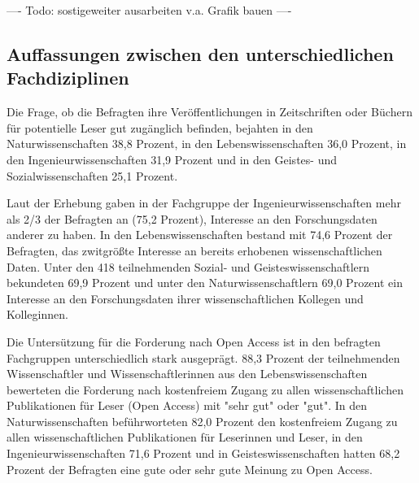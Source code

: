 ---- Todo: sostigeweiter ausarbeiten v.a. Grafik bauen ----

\subsection{Auffassungen zwischen den unterschiedlichen Fachdiziplinen}

Die Frage, ob die Befragten ihre Veröffentlichungen in Zeitschriften oder Büchern für potentielle Leser gut zugänglich befinden, bejahten in den Naturwissenschaften 38,8 Prozent, in den Lebenswissenschaften 36,0 Prozent, in den Ingenieurwissenschaften 31,9 Prozent und in den Geistes- und Sozialwissenschaften 25,1 Prozent.

Laut der Erhebung gaben in der Fachgruppe der Ingenieurwissenschaften mehr als 2/3 der Befragten an (75,2 Prozent), Interesse an den Forschungsdaten anderer  zu haben. In den Lebenswissenschaften bestand mit 74,6 Prozent der Befragten, das zwitgrößte Interesse an bereits erhobenen wissenschaftlichen Daten. Unter den 418 teilnehmenden Sozial- und Geisteswissenschaftlern bekundeten 69,9 Prozent und unter den Naturwissenschaftlern 69,0 Prozent ein Interesse an den Forschungsdaten ihrer wissenschaftlichen Kollegen und Kolleginnen.

Die Untersützung für die Forderung nach Open Access ist in den befragten Fachgruppen unterschiedlich stark ausgeprägt. 88,3 Prozent der teilnehmenden Wissenschaftler und Wissenschaftlerinnen aus den Lebenswissenschaften bewerteten die Forderung nach kostenfreiem Zugang zu allen wissenschaftlichen Publikationen für Leser (Open Access) mit "sehr gut" oder "gut". In den Naturwissenschaften beführworteten 82,0 Prozent den kostenfreiem Zugang zu allen wissenschaftlichen Publikationen für Leserinnen und Leser, in den Ingenieurwissenschaften 71,6 Prozent und in Geisteswissenschaften hatten 68,2 Prozent der Befragten eine gute oder sehr gute Meinung zu Open Access.

